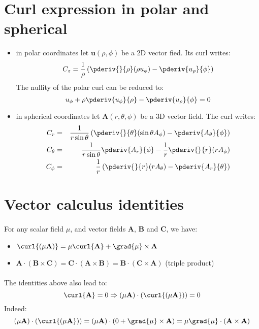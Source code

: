 \section*{Curl expression in polar and spherical}
\begin{itemize}
\item in polar coordinates let $\mathbf{u}(\rho, \phi)$ be a 2D vector fied.
Its curl writes:
\[ C_z= \frac{1}{\rho}\left( \pderiv{}{\rho}(\rho u_\phi) - \pderiv{u_\rho}{\phi} \right)\]
The nullity of the polar curl can be reduced to:
\[ u_\phi + \rho\pderiv{u_\phi}{\rho} - \pderiv{u_\rho}{\phi} = 0 \]

\item in spherical coordinates let  $\mathbf{A}(r, \theta, \phi)$ be a 3D vector field.
The curl writes:
\begin{eqnarray*}
C_r &=& \frac{1}{r\sin\theta} \left( \pderiv{}{\theta}(\sin\theta A_\phi) 
        - \pderiv{A_\theta}{\phi} \right) \\
C_\theta &=& \frac{1}{r\sin\theta} \pderiv{A_r}{\phi} - \frac{1}{r}\pderiv{}{r}(rA_\phi) \\
C_\phi &=& \frac{1}{r} \left( \pderiv{}{r}(rA_\theta) - \pderiv{A_r}{\theta} \right)
\end{eqnarray*}
\end{itemize}

\section*{Vector calculus identities}
\paragraph{}
For any scalar field $\mu$, and vector fields $\mathbf{A}$, $\mathbf{B}$ and
$ \mathbf{C}$, we have:
\begin{itemize}
\item $ \curl{(\mu \mathbf{A})} = \mu \curl{\mathbf{A}} + \grad{\mu} \times \mathbf{A}$ 
\item $ \mathbf{A}\cdot(\mathbf{B} \times \mathbf{C}) = \mathbf{C}\cdot(\mathbf{A} 
\times \mathbf{B}) = \mathbf{B}\cdot(\mathbf{C} \times \mathbf{A})$ (triple product)
\end{itemize}

\paragraph{}
The identities above also lead to:
\[
\curl{\mathbf{A}} = 0 \Rightarrow (\mu \mathbf{A}) \cdot (\curl{(\mu \mathbf{A}})) = 0
\]
Indeed:
\[  (\mu \mathbf{A}) \cdot (\curl{(\mu \mathbf{A}})) =
  (\mu \mathbf{A}) \cdot (0 + \grad{\mu} \times \mathbf{A}) = 
   \mu \grad{\mathbf{\mu}}\cdot(\mathbf{A} \times \mathbf{A})
\]


